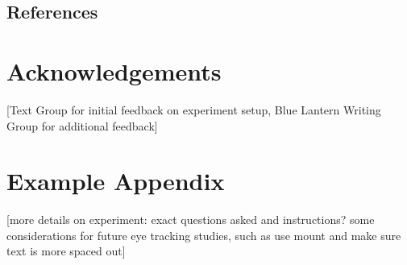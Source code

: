 \documentclass[11pt]{article}
\begin{document}
\subsection{References}

\nocite{Green2004,liwc_22,kuzmicova2014,brysbaert2014,chung-fat-yim_cilento_piotrowska_mar_2019,Maslej2019TheTF,boyd_blackburn_pennebaker_2020,green_brock_kaufman_2006,kasunic_kaufman_2018,Consoli2018,busselle2009,jacobs2018,jacobs2017,stockwell2002cognitive,HSU201596,willems_2015,mak2019,kunze2015,ferreira-goncalo-oliveira-2018-seeking,rashkin-etal-2016-connotation,aryani2013,delatorre2019,andrade2020,indico2015}





\section*{Acknowledgements}

[Text Group for initial feedback on experiment setup, Blue Lantern Writing Group for additional feedback]

\appendix

\section{Example Appendix}
\label{sec:appendix}

[more details on experiment: exact questions asked and instructions? some considerations for future eye tracking studies, such as use mount and make sure text is more spaced out]
\end{document}
